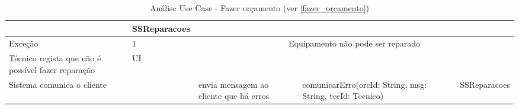 \documentclass[../relatorio.tex]{subfiles}
\begin{document}
\begin{landscape}
\begin{table}[!h]
\begin{tabular}{|p{5cm}|p{1cm}|p{4cm}|p{6cm}|p{3cm}|}
                     & 
            SSReparacoes
            \\
            \hline
            \rowcolor{red!30}
            Exceção
                     & 
            1 
                     & 
            \multicolumn{3}{c}{Equipamento não pode ser reparado}
            \\
            \rowcolor{yellow}
            \hline
            Técnico regista que não é possível fazer reparação
                     & 
            UI
                     & 
                     & 
                     & 
            \\
            \hline
            Sistema comunica o cliente
                     & 
                     & 
            envia mensagem ao cliente que há erros
                     & 
            comunicarErro(orcId: String, msg: String, tecId: Tecnico)
                     & 
            SSReparacoes
            \\
            \hline
        \end{tabular}
        \caption{Análise Use Case - Fazer orçamento (ver \ref{fazer_orcamento})}
    \end{table}
\end{landscape}
\end{document}
